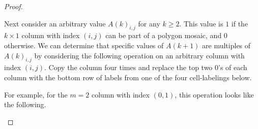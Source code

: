 \documentclass[12pt]{article}
\theoremstyle{plain}
\theoremstyle{definition}
\theoremstyle{remark}
\theoremstyle{definition}
\newcommand{\cell}[4]{ \draw[thick] ( #1 , #2 ) rectangle ( #3 , #4 );}
\newcommand{\lablnode}[3]{\node[shape=circle,draw=none,fill=none, inner sep=0pt,minimum size=5pt] (A) at ( #1 , #2 ) {#3};}
\newcommand{\lablvertex}[3]{\node[shape=circle,draw=none,fill=white, inner sep=2pt,minimum size=5pt] (A) at ( #1 , #2 ) {#3};}
\begin{document}
\begin{proof}
\begin{center}
\end{center}

Next consider an arbitrary value $A(k)_{i,j}$ for any $k \geq 2$. This value is $1$ if the $k \times 1$ column with index $(i,j)$ can be part of a polygon mosaic, and $0$ otherwise. We can determine that specific values of $A(k+1)$ are multiples of $A(k)_{i,j}$ by considering the following operation on an arbitrary column with index $(i,j)$. Copy the column four times and replace the top two $0$'s of each column with the bottom row of labels from one of the four cell-labelings below. 

\begin{center}
\end{center}

For example, for the $m=2$ column with index $(0,1)$, this operation looks like the following.

\begin{center}
\end{center}
\end{proof}
\end{document}
